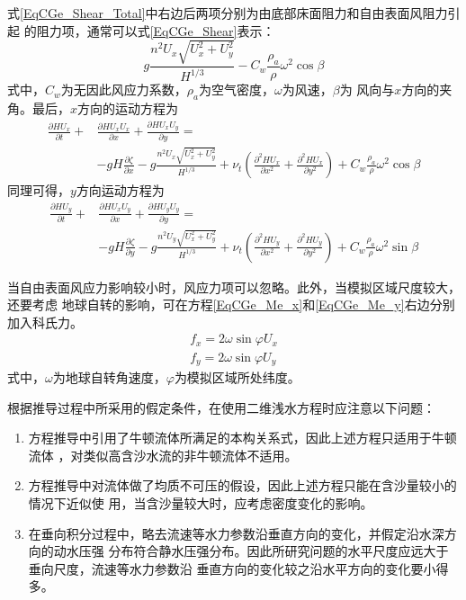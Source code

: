 式\eqref{EqCGe_Shear_Total}中右边后两项分别为由底部床面阻力和自由表面风阻力引起
的阻力项，通常可以式\eqref{EqCGe_Shear}表示：
\begin{equation}
  g\frac{n^{2}U_{x}\sqrt{U_{x}^{2}+U_{y}^{2}}}{H^{1/3}}
  -
  C_{w}\frac{\rho_{a}}{\rho}\omega^{2}\cos\beta
  \label{EqCGe_Shear}
\end{equation}
式中，$C_{w}$为无因此风应力系数，$\rho_{a}$为空气密度，$\omega$为风速，$\beta$为
风向与$x$方向的夹角。最后，$x$方向的运动方程为
\begin{equation}
  \begin{aligned}
  \frac{\partial HU_{x}}{\partial t} +
  &\frac{\partial HU_{x}U_{x}}{\partial x} +
  \frac{\partial HU_{x}U_{y}}{\partial y} 
  =\\
  &-gH\frac{\partial \zeta}{\partial x}
  -g\frac{n^{2}U_{x}\sqrt{U_{x}^{2}+U_{y}^{2}}}{H^{1/3}}
  +
  \nu_{t}\left(
    \frac{\partial^{2}HU_{x}}{\partial x^{2}}+
    \frac{\partial^{2}HU_{x}}{\partial y^{2}}
\right)
  +C_{w}\frac{\rho_{a}}{\rho}\omega^{2}\cos\beta
  \end{aligned}
  \label{EqCGe_Me_x}
\end{equation}
同理可得，$y$方向运动方程为
\begin{equation}
  \begin{aligned}
  \frac{\partial HU_{y}}{\partial t} +
  &\frac{\partial HU_{x}U_{y}}{\partial x} +
  \frac{\partial HU_{y}U_{y}}{\partial y} 
  =\\
  &-gH\frac{\partial \zeta}{\partial y}
  -g\frac{n^{2}U_{y}\sqrt{U_{x}^{2}+U_{y}^{2}}}{H^{1/3}}
  +
  \nu_{t}\left(
    \frac{\partial^{2}HU_{y}}{\partial x^{2}}+
    \frac{\partial^{2}HU_{y}}{\partial y^{2}}
\right)
  +C_{w}\frac{\rho_{a}}{\rho}\omega^{2}\sin\beta
  \end{aligned}
  \label{EqCGe_Me_y}
\end{equation}

当自由表面风应力影响较小时，风应力项可以忽略。此外，当模拟区域尺度较大，还要考虑
地球自转的影响，可在方程\eqref{EqCGe_Me_x}和\eqref{EqCGe_Me_y}右边分别加入科氏力。
\begin{equation}
  \begin{aligned}
    f_x = 2\omega\sin\varphi U_{x} 
    \\
    f_y = 2\omega\sin\varphi U_{y} 
  \end{aligned}
\end{equation}
式中，$\omega$为地球自转角速度，$\varphi$为模拟区域所处纬度。

根据推导过程中所采用的假定条件，在使用二维浅水方程时应注意以下问题：
\begin{enumerate}
  \item 方程推导中引用了牛顿流体所满足的本构关系式，因此上述方程只适用于牛顿流体
，对类似高含沙水流的非牛顿流体不适用。
 \item 方程推导中对流体做了均质不可压的假设，因此上述方程只能在含沙量较小的情况下近似使
用，当含沙量较大时，应考虑密度变化的影响。
\item 在垂向积分过程中，略去流速等水力参数沿垂直方向的变化，并假定沿水深方向的动水压强
分布符合静水压强分布。因此所研究问题的水平尺度应远大于垂向尺度，流速等水力参数沿
垂直方向的变化较之沿水平方向的变化要小得多。
\end{enumerate}

